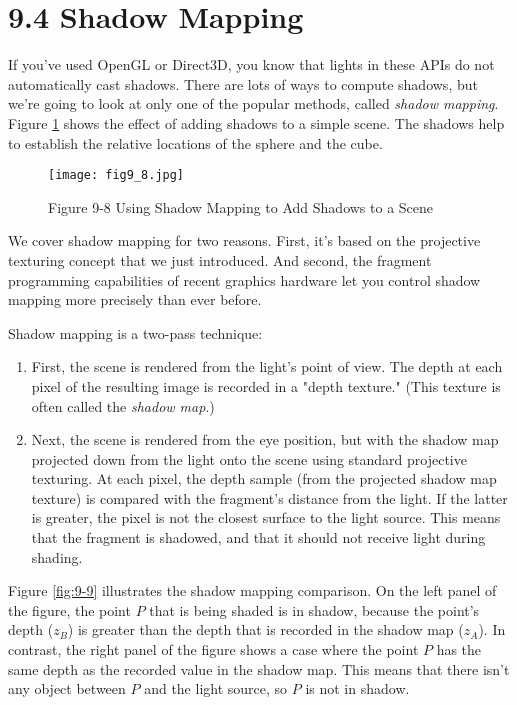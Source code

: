 \documentclass[../main.tex]{subfiles}
\begin{document}
\section{9.4 Shadow Mapping}

If you've used OpenGL or Direct3D, you know that lights in these APIs do not automatically cast shadows. There are lots of ways to compute shadows, but we're going to look at only one of the popular methods, called \textit{shadow mapping}. Figure \ref{fig:9-8} shows the effect of adding shadows to a simple scene. The shadows help to establish the relative locations of the sphere and the cube.

\begin{figure}
    \centering
    \texttt{[image: fig9\_8.jpg]}
    \caption{Figure 9-8 Using Shadow Mapping to Add Shadows to a Scene}
    \label{fig:9-8}
\end{figure}

We cover shadow mapping for two reasons. First, it's based on the projective texturing concept that we just introduced. And second, the fragment programming capabilities of recent graphics hardware let you control shadow mapping more precisely than ever before.

Shadow mapping is a two-pass technique:

\begin{enumerate}
\item First, the scene is rendered from the light's point of view. The depth at each pixel of the resulting image is recorded in a "depth texture." (This texture is often called the \textit{shadow map}.)
\item Next, the scene is rendered from the eye position, but with the shadow map projected down from the light onto the scene using standard projective texturing. At each pixel, the depth sample (from the projected shadow map texture) is compared with the fragment's distance from the light. If the latter is greater, the pixel is not the closest surface to the light source. This means that the fragment is shadowed, and that it should not receive light during shading.
\end{enumerate}

Figure \ref{fig:9-9} illustrates the shadow mapping comparison. On the left panel of the figure, the point $P$ that is being shaded is in shadow, because the point's depth ($z_B$) is greater than the depth that is recorded in the shadow map ($z_A$). In contrast, the right panel of the figure shows a case where the point $P$ has the same depth as the recorded value in the shadow map. This means that there isn't any object between $P$ and the light source, so $P$ is not in shadow.
\end{document}
